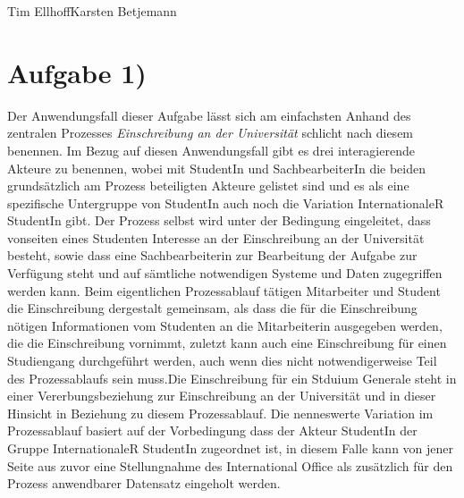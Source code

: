 \documentclass{swp1}
\begin{document}
          {Tim Ellhoff}{Karsten Betjemann}{}
          
\section*{Aufgabe 1)}

Der Anwendungsfall dieser Aufgabe lässt sich am einfachsten Anhand des zentralen Prozesses \emph{Einschreibung an der Universität} schlicht nach diesem benennen.\newline
Im Bezug auf diesen Anwendungsfall gibt es drei interagierende Akteure zu benennen, wobei mit StudentIn und SachbearbeiterIn die beiden grundsätzlich am Prozess beteiligten Akteure gelistet sind und es als eine spezifische Untergruppe von StudentIn auch noch die Variation InternationaleR StudentIn gibt.\newline
Der Prozess selbst wird unter der Bedingung eingeleitet, dass vonseiten eines Studenten Interesse an der Einschreibung an der Universität besteht, sowie dass eine Sachbearbeiterin zur Bearbeitung der Aufgabe zur Verfügung steht und auf sämtliche notwendigen Systeme und Daten zugegriffen werden kann.\newline
Beim eigentlichen Prozessablauf tätigen Mitarbeiter und Student die Einschreibung dergestalt gemeinsam, als dass die für die Einschreibung nötigen Informationen vom Studenten an die Mitarbeiterin ausgegeben werden, die die Einschreibung vornimmt, zuletzt kann auch eine Einschreibung für einen Studiengang durchgeführt werden, auch wenn dies nicht notwendigerweise Teil des Prozessablaufs sein muss.Die Einschreibung für ein Stduium Generale steht in einer Vererbungsbeziehung zur Einschreibung an der Universität und in dieser Hinsicht in Beziehung zu diesem Prozessablauf.\newline
Die nenneswerte Variation im Prozessablauf basiert auf der Vorbedingung dass der Akteur StudentIn der Gruppe InternationaleR StudentIn zugeordnet ist, in diesem Falle kann von jener Seite aus zuvor eine Stellungnahme des International Office als zusätzlich für den Prozess anwendbarer Datensatz eingeholt werden.
\end{document}
